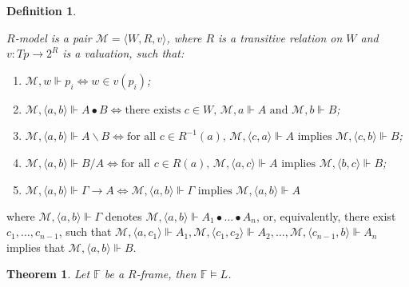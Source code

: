 \documentclass[a4paper]{article}
\theoremstyle{defin}
\newtheorem{defin}{Definition}
\theoremstyle{theorem}
\newtheorem{theorem}{Theorem}
\theoremstyle{prop}
\theoremstyle{lemma}
\theoremstyle{ex}
\theoremstyle{col}
\begin{document}
\begin{defin}
  $ $

  $R$-model is a pair $\mathcal{M} = \langle W, R, v \rangle$,
  where $R$ is a transitive relation on $W$ and $v : Tp \to 2^R$ is a valuation, such that:

  \begin{enumerate}
    \item $\mathcal{M}, w \Vdash p_i \Leftrightarrow w \in v(p_i)$;
    \item $\mathcal{M}, \langle a, b \rangle \Vdash A \bullet B \Leftrightarrow
      \text{there exists $c \in W$, $\mathcal{M}, a \Vdash A$ and $\mathcal{M}, b \Vdash B$}$;
    \item $\mathcal{M}, \langle a, b \rangle \Vdash A \backslash B \Leftrightarrow
      \text{for all $c \in R^{-1}(a)$, $\mathcal{M}, \langle c, a \rangle \Vdash A$ implies
      $\mathcal{M}, \langle c, b \rangle \Vdash B$}$;
    \item $\mathcal{M}, \langle a, b \rangle \Vdash B / A \Leftrightarrow
        \text{for all $c \in R(a)$, $\mathcal{M}, \langle a, c \rangle \Vdash A$ implies
        $\mathcal{M}, \langle b, c \rangle \Vdash B$}$;
    \item $\mathcal{M}, \langle a, b \rangle \Vdash \Gamma \rightarrow A \Leftrightarrow
    \mathcal{M}, \langle a, b \rangle \Vdash \Gamma \text{ implies } \mathcal{M}, \langle a, b \rangle \Vdash A$
  \end{enumerate}
\end{defin}

where $\mathcal{M}, \langle a, b \rangle \Vdash \Gamma$ denotes $\mathcal{M}, \langle a, b \rangle \Vdash A_1 \bullet \dots \bullet A_n$, or,
equivalently, there exist $c_1, \dots, c_{n-1}$,
such that $\mathcal{M}, \langle a, c_1 \rangle \Vdash A_1,
\mathcal{M}, \langle c_1, c_2 \rangle \Vdash A_2, \dots,
\mathcal{M}, \langle c_{n-1}, b \rangle \Vdash A_n$ implies that $\mathcal{M}, \langle a, b \rangle \Vdash B$.

\begin{theorem}
  Let $\mathbb{F}$ be a $R$-frame, then $\mathbb{F} \models L$.
\end{theorem}
\end{document}
